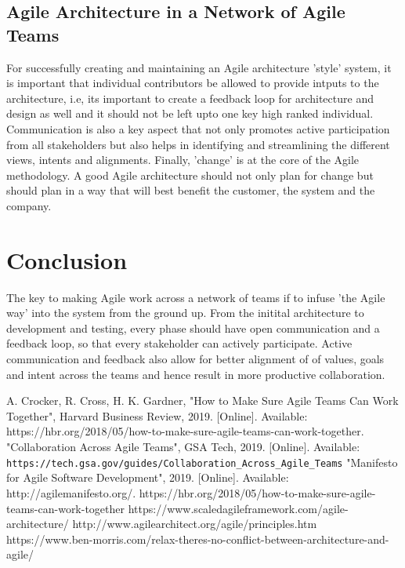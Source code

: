 \documentclass[sigplan,screen]{acmart}
\begin{document}
\subsection{Agile Architecture in a Network of Agile Teams}
For successfully creating and maintaining an Agile architecture 'style' system, it is important that individual contributors be allowed to provide intputs to the architecture, i.e, its important to create a feedback loop for architecture and design as well and it should not be left upto one key high ranked individual.
Communication is also a key aspect that not only promotes active participation from all stakeholders but also helps in identifying and streamlining the different views, intents and alignments.
Finally, 'change' is at the core of the Agile methodology. A good Agile architecture should not only plan for change but should plan in a way that will best benefit the customer, the system and the company.   

\section{Conclusion}
The key to making Agile work across a network of teams if to infuse 'the Agile way' into the system from the ground up.
From the initital architecture to development and testing, every phase should have open communication and a feedback loop, so that every stakeholder can actively participate.
Active communication and feedback also allow for better alignment of of values, goals and intent across the teams and hence result in more productive collaboration.  
 
\begin{thebibliography}{00}
   A. Crocker, R. Cross, H. K. Gardner, "How to Make Sure Agile Teams Can Work Together", Harvard Business Review, 2019. [Online]. Available: https://hbr.org/2018/05/how-to-make-sure-agile-teams-can-work-together.
   "Collaboration Across Agile Teams", GSA Tech, 2019. [Online]. Available: \verb| https://tech.gsa.gov/guides/Collaboration_Across_Agile_Teams|
   "Manifesto for Agile Software Development", 2019. [Online]. Available: http://agilemanifesto.org/.
   https://hbr.org/2018/05/how-to-make-sure-agile-teams-can-work-together 
   https://www.scaledagileframework.com/agile-architecture/
   http://www.agilearchitect.org/agile/principles.htm 
   https://www.ben-morris.com/relax-theres-no-conflict-between-architecture-and-agile/ 
\end{thebibliography}
\end{document}
